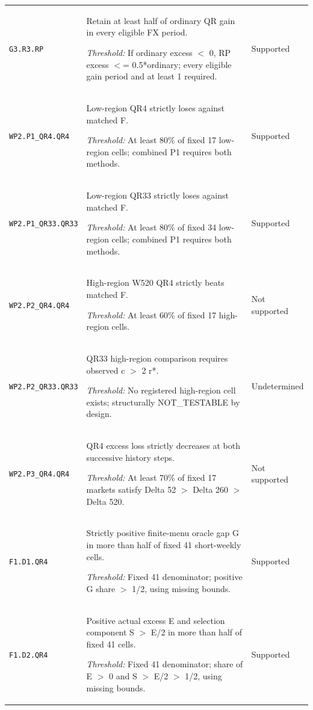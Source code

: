 \documentclass[10pt,a4paper]{article}
\begin{document}
{\begin{longtable}{p{2.0cm}p{10.5cm}p{2.5cm}}
\texttt{G3.\allowbreak{}R3.\allowbreak{}RP} & Retain at least half of ordinary QR gain in every eligible FX period.\par\emph{Threshold:} If ordinary excess \ensuremath{<} 0,\allowbreak{} RP excess \ensuremath{<}=\allowbreak{} 0.5*ordinary; every eligible gain period and at least 1 required. & Supported \\[3pt]
\texttt{WP2.\allowbreak{}P1\_QR4.\allowbreak{}QR4} & Low-region QR4 strictly loses against matched F.\par\emph{Threshold:} At least 80\% of fixed 17 low-region cells; combined P1 requires both methods. & Supported \\[3pt]
\texttt{WP2.\allowbreak{}P1\_QR33.\allowbreak{}QR33} & Low-region QR33 strictly loses against matched F.\par\emph{Threshold:} At least 80\% of fixed 34 low-region cells; combined P1 requires both methods. & Supported \\[3pt]
\texttt{WP2.\allowbreak{}P2\_QR4.\allowbreak{}QR4} & High-region W520 QR4 strictly beats matched F.\par\emph{Threshold:} At least 60\% of fixed 17 high-region cells. & Not supported \\[3pt]
\texttt{WP2.\allowbreak{}P2\_QR33.\allowbreak{}QR33} & QR33 high-region comparison requires observed c \ensuremath{>} 2 r*.\par\emph{Threshold:} No registered high-region cell exists; structurally NOT\_\allowbreak{}TESTABLE by design. & Undetermined \\[3pt]
\texttt{WP2.\allowbreak{}P3\_QR4.\allowbreak{}QR4} & QR4 excess loss strictly decreases at both successive history steps.\par\emph{Threshold:} At least 70\% of fixed 17 markets satisfy Delta 52 \ensuremath{>} Delta 260 \ensuremath{>} Delta 520. & Not supported \\[3pt]
\texttt{F1.\allowbreak{}D1.\allowbreak{}QR4} & Strictly positive finite-menu oracle gap G in more than half of fixed 41 short-weekly cells.\par\emph{Threshold:} Fixed 41 denominator; positive G share \ensuremath{>} 1/\allowbreak{}2,\allowbreak{} using missing bounds. & Supported \\[3pt]
\texttt{F1.\allowbreak{}D2.\allowbreak{}QR4} & Positive actual excess E and selection component S \ensuremath{>} E/\allowbreak{}2 in more than half of fixed 41 cells.\par\emph{Threshold:} Fixed 41 denominator; share of E \ensuremath{>} 0 and S \ensuremath{>} E/\allowbreak{}2 \ensuremath{>} 1/\allowbreak{}2,\allowbreak{} using missing bounds. & Supported \\[3pt]

\end{longtable}}
\end{document}
